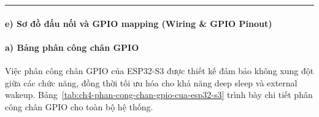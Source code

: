 \documentclass[a4paper]{extarticle}
\newcommand{\tabref}[1]{Bảng~\ref{#1}}
\begin{document}
\begin{center}\rule{0.5\linewidth}{0.5pt}\end{center}

\paragraph{e) Sơ đồ đấu nối và GPIO mapping (Wiring \& GPIO
Pinout)}\label{e-sux1a1-ux111ux1ed3-ux111ux1ea5u-nux1ed1i-vuxe0-gpio-mapping-wiring--gpio-pinout}

\paragraph{a) Bảng phân công chân
GPIO}\label{a-bux1ea3ng-phuxe2n-cuxf4ng-chuxe2n-gpio}

Việc phân công chân GPIO của ESP32-S3 được thiết kế đảm bảo không xung
đột giữa các chức năng, đồng thời tối ưu hóa cho khả năng deep sleep và
external wakeup. \tabref{tab:ch4-phan-cong-chan-gpio-cua-esp32-s3} trình bày chi tiết phân công chân GPIO cho
toàn bộ hệ thống.
\end{document}
